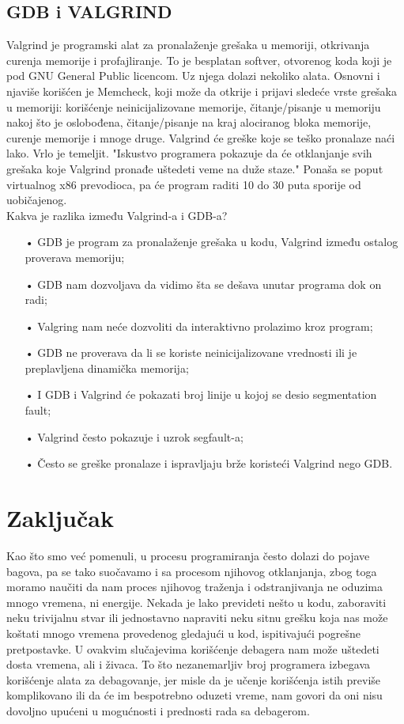 \documentclass[a4paper]{article}
\begin{document}
\subsection{GDB i VALGRIND}
\label{subsec:valgrind}
Valgrind je programski alat za pronalaženje grešaka u memoriji, otkrivanja curenja memorije i 
profajliranje. To je besplatan softver, otvorenog koda koji je pod GNU General Public licencom. 
Uz njega dolazi nekoliko alata. Osnovni i njaviše korišćen je Memcheck, koji može da otkrije i  
prijavi sledeće vrste grešaka u memoriji: korišćenje neinicijalizovane memorije, čitanje/pisanje u 
memoriju nakoj što je oslobođena, čitanje/pisanje na kraj alociranog bloka memorije, 
curenje memorije i  mnoge druge. Valgrind će greške koje se teško pronalaze naći lako. Vrlo je 
temeljit. "Iskustvo programera pokazuje da će otklanjanje svih grešaka koje Valgrind pronađe 
uštedeti veme na duže staze." Ponaša se poput virtualnog x86 prevodioca, pa će program raditi 10 
do 30 puta sporije od uobičajenog. \\

Kakva je razlika između Valgrind-a i GDB-a?
\begin{enumerate}
\item[•]GDB je program za pronalaženje grešaka u kodu, Valgrind između ostalog proverava memoriju;
\item[•]GDB nam dozvoljava da vidimo šta se dešava unutar programa dok on radi;
\item[•]Valgring nam neće dozvoliti da interaktivno prolazimo kroz program;
\item[•]GDB ne proverava da li se koriste neinicijalizovane vrednosti ili je preplavljena dinamička memorija;
\item[•]I GDB i Valgrind će pokazati broj linije u kojoj se desio segmentation fault;
\item[•]Valgrind često pokazuje i uzrok segfault-a;
\item[•]Često se greške pronalaze i ispravljaju brže koristeći Valgrind nego GDB. 
\end{enumerate}

\section{Zaključak}
\label{sec:zakljucak}

Kao što smo već pomenuli, u procesu programiranja često dolazi do pojave bagova, pa se tako suočavamo i sa procesom njihovog otklanjanja, zbog toga moramo naučiti da nam proces njihovog traženja i odstranjivanja ne oduzima mnogo vremena, ni energije. Nekada je lako prevideti nešto u kodu, zaboraviti neku trivijalnu stvar ili jednostavno napraviti neku sitnu grešku koja nas može koštati mnogo vremena provedenog gledajući u kod, ispitivajući pogrešne pretpostavke. U ovakvim slučajevima korišćenje debagera nam može uštedeti dosta vremena, ali i živaca. To što nezanemarljiv broj programera izbegava korišćenje alata za debagovanje, jer misle da je učenje korišćenja istih previše komplikovano ili da će im bespotrebno oduzeti vreme, nam govori da oni nisu dovoljno upućeni u mogućnosti i prednosti rada sa debagerom.
\end{document}
